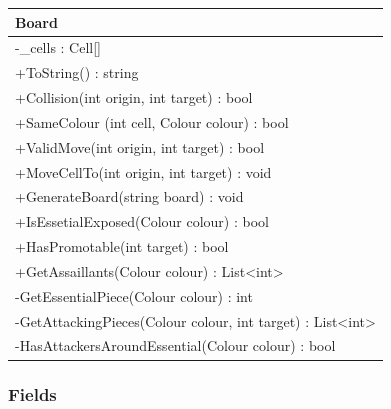 \documentclass[12pt]{article}
\begin{document}
    \begin{table}[H]
        \begin{tabular}{|l|}
            \hline
            \rowcolor[HTML]{C0C0C0}
            \textbf{Board}                                                                    \\ \hline
            \rowcolor[HTML]{EFEFEF}
            -\_cells : Cell[]                                                                 \\ \hline
            +ToString() : string                                                              \\ \hline
            +Collision(int origin, int target) : bool                                         \\ \hline
            +SameColour (int cell, Colour colour) : bool                                      \\ \hline
            +ValidMove(int origin, int target) : bool                                         \\ \hline
            +MoveCellTo(int origin, int target) : void                                        \\ \hline
            +GenerateBoard(string board) : void                                               \\ \hline
            +IsEssetialExposed(Colour colour) : bool                                          \\ \hline
            +HasPromotable(int target) : bool                                                 \\ \hline
            +GetAssaillants(Colour colour) : List\textless{}int\textgreater{}                 \\ \hline
            -GetEssentialPiece(Colour colour) : int                                           \\ \hline
            -GetAttackingPieces(Colour colour, int target) : List\textless{}int\textgreater{} \\ \hline
            -HasAttackersAroundEssential(Colour colour) : bool                                \\ \hline
        \end{tabular}
    \end{table}

    \subsubsection{Fields}
\end{document}
